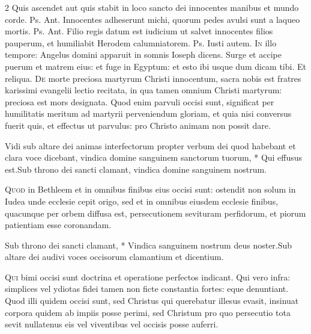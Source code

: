 \begin{multicols*}{2}
 Quis ascendet aut quis stabit in loco sancto dei innocentes manibus et mundo corde. {\color{Red} Ps.}  {\color{Red} Ant.} Innocentes adheserunt michi, quorum pedes avulsi sunt a laqueo mortis. {\color{Red} Ps.}  {\color{Red} Ant.} Filio regis datum est iudicium ut salvet innocentes filios pauperum, et humiliabit Herodem calumniatorem. {\color{Red} Ps.}  \V Iusti autem.%
\lettrine[lines=2]{\zallmancaps \color{Red} I}{n} illo tempore: Angelus domini apparuit in somnis Ioseph dicens. Surge et accipe puerum et matrem eius: et fuge in Egyptum: et esto ibi usque dum dicam tibi. Et reliqua.
\lettrine[lines=2]{\zallmancaps \color{Blue} D}{e} morte preciosa martyrum Christi innocentum, sacra nobis est fratres karissimi evangelii lectio recitata, in qua tamen omnium Christi martyrum: preciosa est mors designata. Quod enim parvuli occisi sunt, significat per humilitatis meritum ad martyrii perveniendum gloriam, et quia nisi conversus fuerit quis, et effectus ut parvulus: pro Christo animam non possit dare.
\begin{responsory}
{Vidi sub altare dei animas interfectorum propter verbum dei quod habebant et clara voce dicebant, vindica domine sanguinem sanctorum tuorum, * Qui effusus est.}{Sub throno dei sancti clamant, vindica domine sanguinem nostrum.}
\end{responsory}%
\lettrine[lines=2]{\zallmancaps \color{Red} Q}{uod} in Bethleem et in omnibus finibus eius occisi sunt: ostendit non solum in Iudea unde ecclesie cepit origo, sed et in omnibus eiusdem ecclesie finibus, quacunque per orbem diffusa est, persecutionem sevituram perfidorum, et piorum patientiam esse coronandam.
\begin{responsory}
{Sub throno dei sancti clamant, * Vindica sanguinem nostrum deus noster.}{Sub altare dei audivi voces occisorum clamantium et dicentium.}
\end{responsory}%
\lettrine[lines=2]{\zallmancaps \color{Blue} Q}{ui} bimi occisi sunt doctrina et operatione perfectos indicant. Qui vero infra: simplices vel ydiotas fidei tamen non ficte constantia fortes: eque denuntiant. Quod illi quidem occisi sunt, sed Christus qui querebatur illesus evasit, insinuat corpora quidem ab impiis posse perimi, sed Christum pro quo persecutio tota sevit nullatenus eis vel viventibus vel occisis posse auferri.

\end{multicols*}
